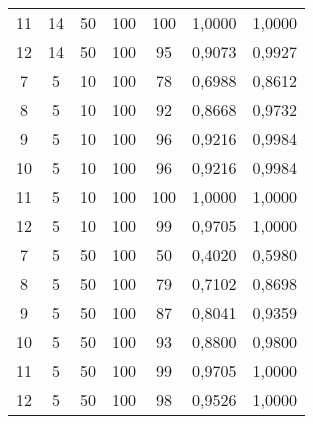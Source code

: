 \begin{table}[H]
\begin{tabular}{@{}ccccccc@{}}
11 & 14                                                    & 50                                                        & 100 & 100 & 1,0000        & 1,0000       \\
12 & 14                                                    & 50                                                        & 100 & 95  & 0,9073        & 0,9927       \\
7  & 5                                                     & 10                                                        & 100 & 78  & 0,6988        & 0,8612       \\
8  & 5                                                     & 10                                                        & 100 & 92  & 0,8668        & 0,9732       \\
9  & 5                                                     & 10                                                        & 100 & 96  & 0,9216        & 0,9984       \\
10 & 5                                                     & 10                                                        & 100 & 96  & 0,9216        & 0,9984       \\
11 & 5                                                     & 10                                                        & 100 & 100 & 1,0000        & 1,0000       \\
12 & 5                                                     & 10                                                        & 100 & 99  & 0,9705        & 1,0000       \\
7  & 5                                                     & 50                                                        & 100 & 50  & 0,4020        & 0,5980       \\
8  & 5                                                     & 50                                                        & 100 & 79  & 0,7102        & 0,8698       \\
9  & 5                                                     & 50                                                        & 100 & 87  & 0,8041        & 0,9359       \\
10 & 5                                                     & 50                                                        & 100 & 93  & 0,8800        & 0,9800       \\
11 & 5                                                     & 50                                                        & 100 & 99  & 0,9705        & 1,0000       \\
12 & 5                                                     & 50                                                        & 100 & 98  & 0,9526        & 1,0000       \\ \bottomrule
\end{tabular}
\end{table}


